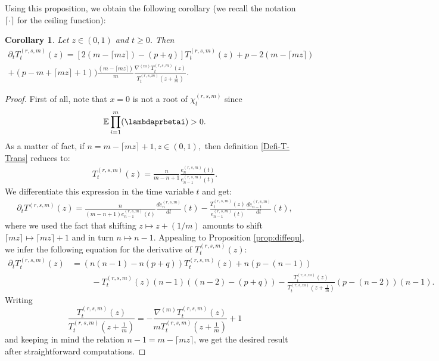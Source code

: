 \documentclass[12pt,reqno]{amsart}
\newtheorem{corollary}{Corollary}
\newcommand{\ceil}[1]{\lceil {#1} \rceil}
\begin{document}
Using this proposition, we obtain the following corollary (we recall the notation $\ceil{\cdot}$ for the ceiling function):
\begin{corollary} Let $z \in (0,1)$ and $t\geq 0$. Then
	\label{cor:odefiniteTtransform}
	\begin{multline*}
		\partial_t T_t^{(r,s,m)}(z)  = [2(m-\ceil{mz})-(p+q)]T_t^{(r,s,m)}(z) +p-2(m-\ceil{mz})                                                                                   \\
		                             +(p-m+\ceil{mz}+1))\frac{({m-\ceil{mz}})}{m}\frac{\nabla^{(m)}T_t^{(r,s,m)}(z)}{T_t^{(r,s,m)}(z+\frac{1}{m})} .
	\end{multline*}
\end{corollary}
\begin{proof}
	First of all, note that $x=0$ is not a root of $\chi_t^{(r,s,m)}$ since 
    \begin{equation*}
       \mathbb{E}\prod_{i=1}^m(\lambdaprbetai) > 0.
    \end{equation*}
    As a matter of fact, if $n = m-\ceil{mz}+1, z\in (0,1),$ then definition \eqref{Defi-T-Trans} reduces to:
\begin{align*}
		T_t^{(r,s,m)}(z) = \frac{n}{m-n+1}\frac{e^{(r,s,m)}_n(t)}{e^{(r,s,m)}_{n-1}(t)}.
	\end{align*}
	 We differentiate this expression in the time variable $t$ and get:
	\begin{align*}
		\partial_tT^{(r,s,m)}(z)=\frac{n}{(m-n+1)e^{(r,s,m)}_{n-1}(t) } \frac{de^{(r,s,m)}_n}{dt}(t)- \frac{T_t^{(r,s,m)}(z)}{e^{(r,s,m)}_{n-1}(t)} \frac{de^{(r,s,m)}_{n-1}}{dt}(t),
	\end{align*}
	where we used the fact that shifting $z \mapsto z + (1/m)$ amounts to shift $\ceil{mz} \mapsto \ceil{mz} + 1$ and in turn $n \mapsto n-1$. 
    Appealing to Proposition \ref{prop:diffequ}, we infer the following equation for the derivative of $T_t^{(r,s,m)}(z)$:
	\begin{align*}
		\partial_tT_t^{(r,s,m)}(z) & = (n(n-1)-n(p+q))T_t^{(r,s,m)}(z) +{n}(p-(n-1))                                                                                                                       \\& \hspace{1cm}-T_t^{(r,s,m)}(z)(n-1)((n-2)- (p+q)) -\frac{T_t^{(r,s,m)}(z)}{T_t^{(r,s,m)}(z+\frac{1}{m})}(p-(n-2))({n-1}).                    
        \end{align*}
	Writing
	$$
		\frac{T_t^{(r,s,m)}(z)}{T_t^{(r,s,m)}(z+\frac{1}{m})} = - \frac{\nabla^{(m)}T_t^{(r,s,m)}(z)}{mT_t^{(r,s,m)}(z+\frac{1}{m})} +1
	$$
	and keeping in mind the relation $n - 1 = m-\ceil{mz}$, we get the desired result after straightforward computations.
\end{proof}
\end{document}
